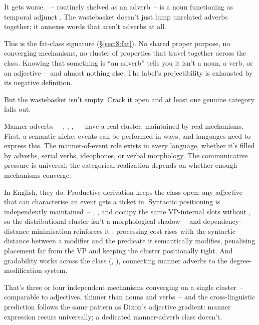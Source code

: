 It gets worse. ~-- routinely shelved as an adverb~-- is a noun functioning as temporal adjunct \citep{huddleston2002}. The wastebasket doesn't just lump unrelated adverbs together; it annexes words that aren't adverbs at all.

This is the fat-class signature (§\ref{sec:8:fat}). No shared proper purpose, no converging mechanisms, no cluster of properties that travel together across the class. Knowing that something is \enquote{an adverb} tells you it isn't a noun, a verb, or an adjective~-- and almost nothing else. The label's projectibility is exhausted by its negative definition.

But the wastebasket isn't empty. Crack it open and at least one genuine category falls out.

Manner adverbs~-- , , , ~-- have a real cluster, maintained by real mechanisms. First, a semantic niche: events can be performed in ways, and languages need to express this. The manner-of-event role exists in every language, whether it's filled by adverbs, serial verbs, ideophones, or verbal morphology. The communicative pressure is universal; the categorical realization depends on whether enough mechanisms converge.

In English, they do. Productive  derivation keeps the class open: any adjective that can characterise an event gets a ticket in. Syntactic positioning is independently maintained~-- , , and  occupy the same VP-internal slots without , so the distributional cluster isn't a morphological shadow~-- and dependency-distance minimisation reinforces it \citep{gibson2025}: processing cost rises with the syntactic distance between a modifier and the predicate it semantically modifies, penalising placement far from the VP and keeping the cluster positionally tight. And gradability works across the class (, ), connecting manner adverbs to the degree-modification system.

That's three or four independent mechanisms converging on a single cluster~-- comparable to adjectives, thinner than nouns and verbs~-- and the cross-linguistic prediction follows the same pattern as Dixon's adjective gradient: manner expression recurs universally; a dedicated manner-adverb class doesn't.

